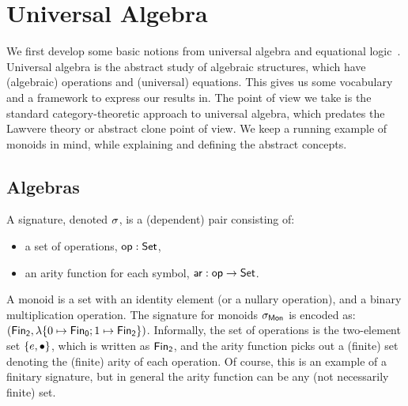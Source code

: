 \section{Universal Algebra}
\label{sec:universal-algebra}

We first develop some basic notions from universal algebra and equational
logic~\cite{birkhoffStructureAbstractAlgebras1935}.
%
Universal algebra is the abstract study of algebraic structures, which have (algebraic) operations and (universal)
equations.
%
This gives us some vocabulary and a framework to express our results in.
%
The point of view we take is the standard category-theoretic approach to universal algebra, which predates the Lawvere
theory or abstract clone point of view.
%
We keep a running example of monoids in mind, while explaining and defining the abstract concepts.

\subsection{Algebras}
\label{sec:universal-algebra:algebras}

\begin{definition}[Signature]\label{algebra:signature}
    \label{def:signature}
    A signature, denoted $\sigma$, is a (dependent) pair consisting of:
    \begin{itemize}
        \item a set of operations, $\operatorname{\mathsf{op}} : \mathsf{Set}$,
        \item an arity function for each symbol, $\operatorname{\mathsf{ar}} : \operatorname{\mathsf{op}} \to \mathsf{Set}$.
    \end{itemize}
\end{definition}

\begin{example}
    A monoid is a set with an identity element (or a nullary operation), and a binary multiplication operation.
    The signature for monoids $\sigma_{\mathsf{Mon}}$ is encoded as:
    $(\Fin[2],\lambda \{0 \mapsto \Fin[0] ; 1 \mapsto \Fin[2] \})$.
    Informally, the set of operations is the two-element set $\{e,\mathbin{\bullet}\}$, which is written as $\Fin[2]$,
    and the arity function picks out a (finite) set denoting the (finite) arity of each operation.
    Of course, this is an example of a finitary signature,
    but in general the arity function can be any (not necessarily finite) set.
\end{example}

